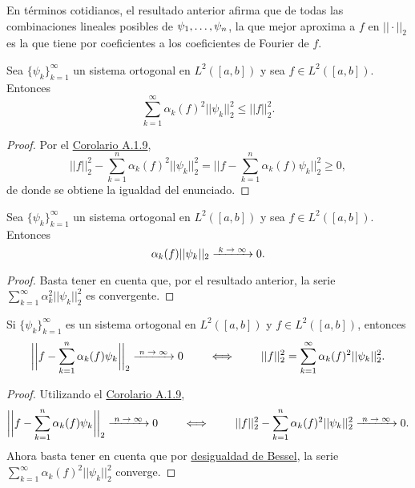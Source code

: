 \documentclass[a4paper, 12pt, extrafontsizes]{memoir}
\begin{document}
En términos cotidianos, el resultado anterior afirma que de todas las combinaciones lineales posibles de $\psi_1,\mathellipsis,\psi_n$, la que mejor aproxima a $f$ en $||\cdot||_2$ es la que tiene por coeficientes a los coeficientes de Fourier de $f$.

\begin{corollary}\label{cor:A.1.11}
    Sea $\{\psi_k\}_{k=1}^\infty$ un sistema ortogonal en $L^2([a,b])$ y sea $f \in L^2([a,b])$. Entonces
    \[\sum_{k=1}^\infty \alpha_k(f)^2||\psi_k||_2^2 \leq ||f||_2^2.\]
\end{corollary}

\begin{proof}
    Por el \hyperref[cor:A.1.9]{\color{gray}Corolario A.1.9},
    \[||f||_2^2 -\sum_{k=1}^n \alpha_k(f)^2||\psi_k||_2^2 = \biggl|\biggl|f-\sum_{k=1}^n \alpha_k(f)\psi_k\biggr|\biggr|_2^2 \geq 0,\]
    de donde se obtiene la igualdad del enunciado.
\end{proof}

\begin{corollary}\label{cor:A.2.8}
    Sea $\{\psi_k\}_{k=1}^\infty$ un sistema ortogonal en $L^2([a,b])$ y sea $f \in L^2([a,b])$. Entonces
    \[\alpha_k(f)||\psi_k||_2 \kconv 0. \]
\end{corollary}

\begin{proof}
    Basta tener en cuenta que, por el resultado anterior, la serie $\sum_{k=1}^\infty \alpha_k^2||\psi_k||_2^2$ es convergente.
\end{proof}

\begin{corollary}
    Si $\{\psi_k\}_{k=1}^\infty$ es un sistema ortogonal en $L^2([a,b])$ y $f \in L^2([a,b])$, entonces
    \[\biggl|\biggl|f-\sum_{k=1}^n \alpha_k(f)\psi_k\biggr|\biggr|_2 \nconv 0 \qquad \iff \qquad ||f||_2^2 = \sum_{k=1}^\infty \alpha_k(f)^2||\psi_k||_2^2.\]
\end{corollary}

\begin{proof}
    Utilizando el \hyperref[cor:A.1.9]{\color{gray}Corolario A.1.9},
    \[\biggl|\biggl|f-\sum_{k=1}^n \alpha_k(f)\psi_k\biggr|\biggr|_2 \nconv 0 \qquad \iff \qquad ||f||_2^2 -\sum_{k=1}^n \alpha_k(f)^2||\psi_k||_2^2 \nconv 0.\]
    Ahora basta tener en cuenta que por \hyperref[cor:A.1.11]{\color{gray}desigualdad de Bessel}, la serie $\sum_{k=1}^\infty \alpha_k(f)^2||\psi_k||_2^2$ converge.
\end{proof}
\end{document}
